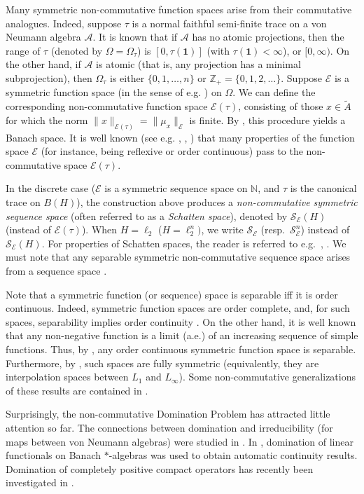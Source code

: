 \documentclass[12pt]{amsart}
\theoremstyle{plain}
\theoremstyle{definition}
\newcommand{\one}{\mathbf{1}}
\newcommand{\Z}{\mathbb Z}
\newcommand{\N}{\mathbb N}
\newcommand{\ce}{\mathcal E}
\newcommand{\se}{{\mathcal S}_{\mathcal{E}}}
\newcommand{\A}{\mathcal{A}}
\begin{document}
Many symmetric non-commutative function spaces arise from their commutative
analogues. Indeed, suppose $\tau$ is a normal faithful semi-finite trace
on a von Neumann algebra $\A$. It is known that  if $\A$ has no atomic projections,
then the range of $\tau$ (denoted by $\Omega = \Omega_\tau$) is $[0,\tau(\one)]$
(with $\tau(\one) < \infty$), or $[0,\infty)$. On the other hand, if $\A$ is atomic
(that is, any projection has a minimal subprojection), then $ \Omega_\tau$ is either
$\{0,1,\ldots,n\}$ or $\Z_+ = \{0,1,2,\ldots\}$.  Suppose
$\ce$ is a symmetric function space (in the sense of e.g. \cite{KPS}) on $\Omega$.
We can define the corresponding non-commutative function space $\ce(\tau)$,
consisting of those $x \in \tilde{A}$ for which the norm
$\|x\|_{\ce(\tau)} = \|\mu_x\|_\ce$ is finite. By \cite{KS}, this procedure
yields a Banach space. It is well known
(see e.g. \cite{DDdP93}, \cite{DdP12}, \cite{deP}) that many properties of the
function space $\ce$ (for instance, being reflexive or order continuous)
pass to the non-commutative space $\ce(\tau)$. 

In the discrete case ($\ce$ is a symmetric sequence space on $\N$, and
$\tau$ is the canonical trace on $B(H)$), the construction above
produces a \emph{non-commutative symmetric sequence space}
(often referred to as a \emph{Schatten space}),
denoted by $\se(H)$ (instead of $\ce(\tau)$). %
When $H = \ell_2$ ($H = \ell_2^n)$, we write $\se$ (resp.~$\se^n$)
instead of $\se(H)$. For properties of Schatten spaces, the reader is
referred to e.g.~\cite{GK}, \cite{Si}.
We must note that any separable symmetric non-commutative sequence
space arises from a sequence space \cite[Section III.6]{GK}.


Note that a symmetric function (or sequence) space is separable iff it is
order continuous. Indeed, symmetric function spaces are order complete,
and, for such spaces, separability implies order continuity
\cite[Proposition 1.a.7]{LT2}.
On the other hand, it is well
known that any non-negative function is a limit (a.e.) of an increasing
sequence of simple functions. Thus, by \cite[Theorem II.4.8]{KPS}, any
order continuous symmetric function space is separable. Furthermore,
by \cite[Theorem II.4.10 and its Corollary]{KPS}, such spaces are fully symmetric
(equivalently, they are interpolation spaces between $L_1$ and $L_\infty$).
Some non-commutative generalizations of these results are contained
in \cite{DdP11}.

Surprisingly, the non-commutative Domination Problem has attracted
little attention so far.
The connections between domination and irreducibility (for maps between
von Neumann algebras) were studied in \cite{Fa}. In \cite{Mu}, domination of linear
functionals on Banach $*$-algebras was used to obtain automatic continuity results.
Domination of completely positive compact operators has recently
been investigated in \cite{DdP10}.
\end{document}

